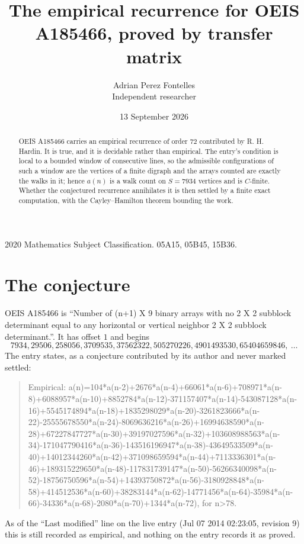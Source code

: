 \documentclass[11pt,a4paper]{article}
\title{The empirical recurrence for OEIS A185466, proved by transfer matrix}
\author{Adrian Perez Fontelles\\ \small Independent researcher}
\date{13 September 2026}
\theoremstyle{plain}
\theoremstyle{definition}
\begin{document}
\maketitle

\begin{abstract}
OEIS A185466 carries an empirical recurrence of order $72$ contributed by R. H. Hardin. It is
true, and it is decidable rather than empirical. The entry's condition is local to a bounded window of consecutive lines, so
the admissible configurations of such a window are the vertices of a finite digraph and the
arrays counted are exactly the walks in it; hence $a(n)$ is a walk count on $S=7934$ vertices
and is $C$-finite. Whether the conjectured recurrence annihilates it is then settled by a
finite exact computation, with the Cayley--Hamilton theorem bounding the work.
\end{abstract}

\noindent\small 2020 Mathematics Subject Classification. 05A15, 05B45, 15B36.\normalsize

\section{The conjecture}

OEIS A185466 is ``Number of (n+1) X 9 binary arrays with no 2 X 2 subblock determinant equal to any horizontal or vertical neighbor 2 X 2 subblock determinant.''. It has offset $1$ and begins
\[
7934, 29506, 258056, 3709535, 37562322, 505270226, 4901493530, 65404659846,\ \dots
\]
The entry states, as a conjecture contributed by its author and never marked settled:
\begin{quote}
Empirical: a(n)=104*a(n-2)+2676*a(n-4)+66061*a(n-6)+708971*a(n-8)+6088957*a(n-10)+8852784*a(n-12)-371157407*a(n-14)-543087128*a(n-16)+5545174894*a(n-18)+1835298029*a(n-20)-3261823666*a(n-22)-25555678550*a(n-24)-8069636216*a(n-26)+16994638590*a(n-28)+67227847727*a(n-30)+39197027596*a(n-32)+103608988563*a(n-34)-171047790416*a(n-36)-143516196947*a(n-38)-43649533509*a(n-40)+14012344260*a(n-42)+371098659594*a(n-44)+7113336301*a(n-46)+189315229650*a(n-48)-117831739147*a(n-50)-56266340098*a(n-52)-18756750596*a(n-54)+14393750872*a(n-56)-3180928848*a(n-58)+414512536*a(n-60)+38283144*a(n-62)-14771456*a(n-64)-35984*a(n-66)-34336*a(n-68)-2080*a(n-70)+1344*a(n-72), for n>78.
\end{quote}
As of the ``Last modified'' line on the live entry (Jul 07 2014 02:23:05, revision 9) this is still
recorded as empirical, and nothing on the entry records it as proved.
\end{document}
